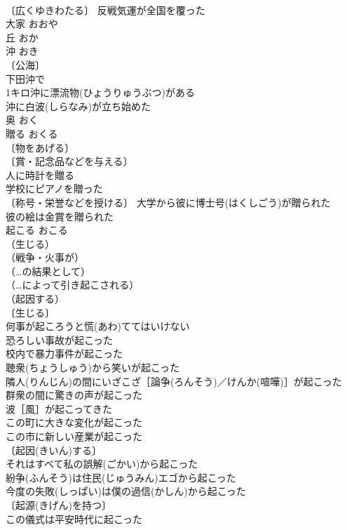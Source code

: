 \documentclass[8pt]{extreport}
\begin{document}
\begin{CJK}{UTF8}{min}
\\	〔広くゆきわたる〕 反戦気運が全国を覆った 
\\	大家	おおや	
\\	丘	おか	
\\	沖	おき	
\\	〔公海〕
\\	下田沖で 
\\	1キロ沖に漂流物(ひょうりゅうぶつ)がある 
\\	沖に白波(しらなみ)が立ち始めた 
\\	奥	おく	
\\	贈る	おくる	
\\	〔物をあげる〕
\\	〔賞・記念品などを与える〕
\\	人に時計を贈る 
\\	学校にピアノを贈った 
\\	〔称号・栄誉などを授ける〕 大学から彼に博士号(はくしごう)が贈られた 
\\	彼の絵は金賞を贈られた 
\\	起こる	おこる	
\\	（生じる）
\\	（戦争・火事が）
\\	（…の結果として）
\\	（…によって引き起こされる）
\\	（起因する）
\\	〔生じる〕
\\	何事が起ころうと慌(あわ)ててはいけない 
\\	恐ろしい事故が起こった 
\\	校内で暴力事件が起こった 
\\	聴衆(ちょうしゅう)から笑いが起こった 
\\	隣人(りんじん)の間にいざこざ［論争(ろんそう)／けんか(喧嘩)］が起こった 
\\	群衆の間に驚きの声が起こった 
\\	波［風］が起こってきた 
\\	この町に大きな変化が起こった 
\\	この市に新しい産業が起こった 
\\	〔起因(きいん)する〕
\\	それはすべて私の誤解(ごかい)から起こった 
\\	紛争(ふんそう)は住民(じゅうみん)エゴから起こった 
\\	今度の失敗(しっぱい)は僕の過信(かしん)から起こった 
\\	〔起源(きげん)を持つ〕
\\	この儀式は平安時代に起こった 

\end{CJK}
\end{document}
